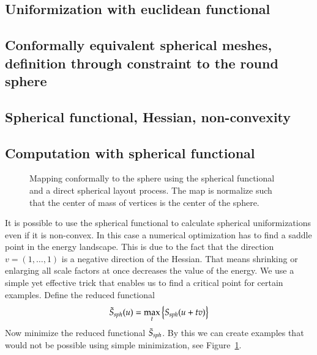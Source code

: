 \documentclass[Thesis.tex]{subfiles}
\begin{document}
  \subsection{Uniformization with euclidean functional}
  \subsection{Conformally equivalent spherical meshes, definition through constraint to the round sphere}
  \subsection{Spherical functional, Hessian, non-convexity}
  \subsection{Computation with spherical functional}

  \begin{figure}
      \centering
  \caption{Mapping conformally to the sphere using the spherical functional and a direct spherical layout process. The map is normalize such that the center of mass of vertices is the center of the sphere.}
  \label{fig:spherical_examples}
  \end{figure}

  It is possible to use the spherical functional to calculate spherical uniformizations even if it is non-convex. In this case a numerical optimization has to find a saddle point in the energy landscape. This is due to the fact that the direction $v=(1,\ldots,1)$ is a negative direction of the Hessian. That means shrinking or enlarging all scale factors at once decreases the value of the energy. We use a simple yet effective trick that enables us to find a critical point for certain examples. Define the reduced functional
  \begin{equation}
  \label{eq:reduced_spherical}
  \tilde S_{\it sph}(u)=\max_t \left\{S_{\it sph}(u + tv)\right\}
  \end{equation}
  Now minimize the reduced functional $\tilde  S_{\it sph}$. By this we can create examples that would not be possible using simple minimization, see Figure~\ref{fig:spherical_examples}.
\end{document}
